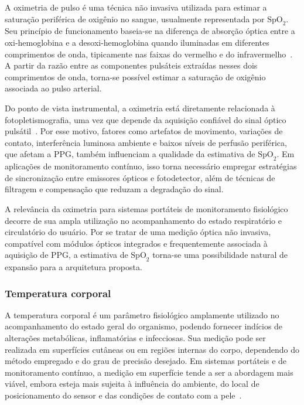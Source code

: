\documentclass[a4paper,12pt]{fcte}
\begin{document}
A oximetria de pulso é uma técnica não invasiva utilizada para estimar a saturação periférica de oxigênio no sangue, usualmente representada por $\mathrm{SpO}_2$. Seu princípio de funcionamento baseia-se na diferença de absorção óptica entre a oxi-hemoglobina e a desoxi-hemoglobina quando iluminadas em diferentes comprimentos de onda, tipicamente nas faixas do vermelho e do infravermelho~\cite{chan2013pulseox}. A partir da razão entre as componentes pulsáteis extraídas nesses dois comprimentos de onda, torna-se possível estimar a saturação de oxigênio associada ao pulso arterial.

Do ponto de vista instrumental, a oximetria está diretamente relacionada à fotopletismografia, uma vez que depende da aquisição confiável do sinal óptico pulsátil~\cite{chan2013pulseox,charlton2022wearable_ppg}. Por esse motivo, fatores como artefatos de movimento, variações de contato, interferência luminosa ambiente e baixos níveis de perfusão periférica, que afetam a PPG, também influenciam a qualidade da estimativa de $\mathrm{SpO}_2$. Em aplicações de monitoramento contínuo, isso torna necessário empregar estratégias de sincronização entre emissores ópticos e fotodetector, além de técnicas de filtragem e compensação que reduzam a degradação do sinal.

A relevância da oximetria para sistemas portáteis de monitoramento fisiológico decorre de sua ampla utilização no acompanhamento do estado respiratório e circulatório do usuário. Por se tratar de uma medição óptica não invasiva, compatível com módulos ópticos integrados e frequentemente associada à aquisição de PPG, a estimativa de $\mathrm{SpO}_2$ torna-se uma possibilidade natural de expansão para a arquitetura proposta.

\subsubsection{Temperatura corporal}

A temperatura corporal é um parâmetro fisiológico amplamente utilizado no acompanhamento do estado geral do organismo, podendo fornecer indícios de alterações metabólicas, inflamatórias e infecciosas. Sua medição pode ser realizada em superfícies cutâneas ou em regiões internas do corpo, dependendo do método empregado e do grau de precisão desejado. Em sistemas portáteis e de monitoramento contínuo, a medição em superfície tende a ser a abordagem mais viável, embora esteja mais sujeita à influência do ambiente, do local de posicionamento do sensor e das condições de contato com a pele~\cite{boano2011temperature,vaghasiya2023wearable_telehealth}.
\end{document}
